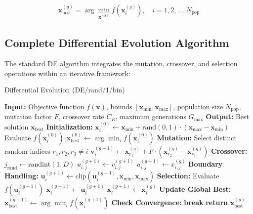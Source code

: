 \documentclass[12pt,a4paper]{report}
\begin{document}
\begin{equation}
\mathbf{x}_{\text{best}}^{(g)} = \arg\min_{\mathbf{x}_i^{(g)}} f(\mathbf{x}_i^{(g)}), \quad i = 1, 2, \ldots, N_{\text{pop}}
\end{equation}

\subsection{Complete Differential Evolution Algorithm}

The standard DE algorithm integrates the mutation, crossover, and selection operations within an iterative framework:

\begin{algorithm}[H]
\caption{Differential Evolution (DE/rand/1/bin)}
\label{alg:differential_evolution}
\begin{algorithmic}[1]
\State \textbf{Input:} Objective function $f(\mathbf{x})$, bounds $[\mathbf{x}_{\text{min}}, \mathbf{x}_{\text{max}}]$, population size $N_{\text{pop}}$, mutation factor $F$, crossover rate $C_R$, maximum generations $G_{\text{max}}$
\State \textbf{Output:} Best solution $\mathbf{x}_{\text{best}}$
\State
\State \textbf{Initialization:}
    \State $\mathbf{x}_i^{(0)} \gets \mathbf{x}_{\text{min}} + \text{rand}(0,1) \cdot (\mathbf{x}_{\text{max}} - \mathbf{x}_{\text{min}})$
    \State Evaluate $f(\mathbf{x}_i^{(0)})$
\EndFor
\State $\mathbf{x}_{\text{best}}^{(0)} \gets \arg\min_i f(\mathbf{x}_i^{(0)})$
\State
{}
        \State \textbf{Mutation:}
        \State Select distinct random indices $r_1, r_2, r_3 \neq i$
        \State $\mathbf{v}_i^{(g+1)} \gets \mathbf{x}_{r_1}^{(g)} + F \cdot (\mathbf{x}_{r_2}^{(g)} - \mathbf{x}_{r_3}^{(g)})$
        \State
        \State \textbf{Crossover:}
        \State $j_{\text{rand}} \gets \text{randint}(1, D)$
                \State $u_{i,j}^{(g+1)} \gets v_{i,j}^{(g+1)}$
            \Else
                \State $u_{i,j}^{(g+1)} \gets x_{i,j}^{(g)}$
            \EndIf
        \EndFor
        \State
        \State \textbf{Boundary Handling:}
        \State $\mathbf{u}_i^{(g+1)} \gets \text{clip}(\mathbf{u}_i^{(g+1)}, \mathbf{x}_{\text{min}}, \mathbf{x}_{\text{max}})$
        \State
        \State \textbf{Selection:}
        \State Evaluate $f(\mathbf{u}_i^{(g+1)})$
            \State $\mathbf{x}_i^{(g+1)} \gets \mathbf{u}_i^{(g+1)}$
        \Else
            \State $\mathbf{x}_i^{(g+1)} \gets \mathbf{x}_i^{(g)}$
        \EndIf
    \EndFor
    \State
    \State \textbf{Update Global Best:}
    \State $\mathbf{x}_{\text{best}}^{(g+1)} \gets \arg\min_i f(\mathbf{x}_i^{(g+1)})$
    \State
    \State \textbf{Check Convergence:}
        \State \textbf{break}
    \EndIf
\EndFor
\State
\State \textbf{return} $\mathbf{x}_{\text{best}}^{(g)}$
\end{algorithmic}
\end{algorithm}
\end{document}
